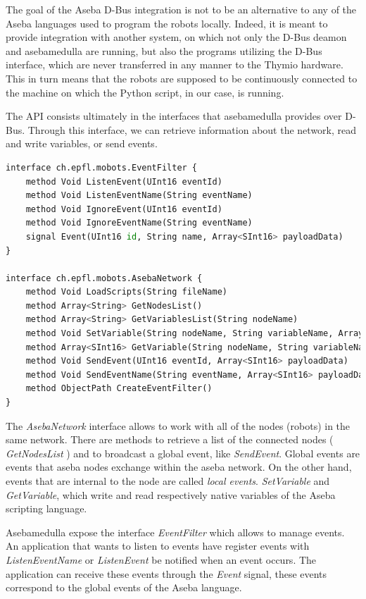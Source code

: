 \documentclass[format=acmsmall, review=false, screen=true]{acmart}
\begin{document}
The goal of the Aseba D-Bus integration is not to be an alternative to any of the Aseba languages used to program the robots locally. Indeed, it is meant to provide integration with another system, on which not only the D-Bus deamon and asebamedulla are running, but also the programs utilizing the D-Bus interface, which are never transferred in any manner to the Thymio hardware. This in turn means that the robots are supposed to be continuously connected to the machine on which the Python script, in our case, is running.

The API consists ultimately in the interfaces that asebamedulla provides over D-Bus. Through this interface, we can retrieve information about the network, read and write variables, or send events.

\begin{lstlisting}[caption={\ The API that asebamedulla provides over D-Bus},language=Python,captionpos=b,label={Asebamedulla API},basicstyle=\small]
interface ch.epfl.mobots.EventFilter {
    method Void ListenEvent(UInt16 eventId)
    method Void ListenEventName(String eventName)
    method Void IgnoreEvent(UInt16 eventId)
    method Void IgnoreEventName(String eventName)
    signal Event(UInt16 id, String name, Array<SInt16> payloadData)
}

interface ch.epfl.mobots.AsebaNetwork {
    method Void LoadScripts(String fileName)
    method Array<String> GetNodesList()
    method Array<String> GetVariablesList(String nodeName)
    method Void SetVariable(String nodeName, String variableName, Array<SInt16> variableData)
    method Array<SInt16> GetVariable(String nodeName, String variableName)
    method Void SendEvent(UInt16 eventId, Array<SInt16> payloadData)
    method Void SendEventName(String eventName, Array<SInt16> payloadData)
    method ObjectPath CreateEventFilter()
}
\end{lstlisting}


The \emph{AsebaNetwork} interface allows to work with all of the nodes (robots) in the same network. There are methods to retrieve a list of the connected nodes ( \emph{GetNodesList} ) and to broadcast a global event, like \emph{SendEvent}. Global events are events that aseba nodes exchange within the aseba network. On the other hand, events that are internal to the node are called \emph{local events}. \emph{SetVariable} and \emph{GetVariable}, which write and read respectively native variables of the Aseba scripting language.

Asebamedulla expose the interface \emph{EventFilter} which allows to manage events. An application that wants to listen to events have register events with \emph{ListenEventName} or \emph	{ListenEvent} be notified when an event occurs. The application can receive these events through the \emph{Event} signal, these events correspond to the global events of the Aseba language.
\end{document}
